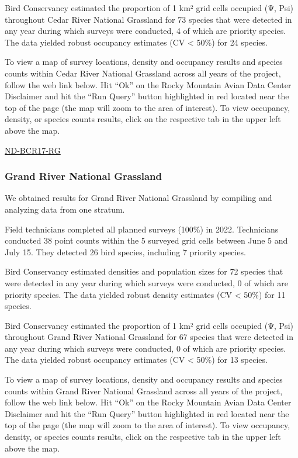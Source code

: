 \documentclass[
  letterpaper,
  DIV=11,
  numbers=noendperiod,
  oneside]{scrreprt}
\begin{document}
Bird Conservancy estimated the proportion of 1 km² grid cells occupied
(Ψ, Psi) throughout Cedar River National Grassland for 73 species that
were detected in any year during which surveys were conducted, 4 of
which are priority species. The data yielded robust occupancy estimates
(CV \textless{} 50\%) for 24 species.

To view a map of survey locations, density and occupancy results and
species counts within Cedar River National Grassland across all years of
the project, follow the web link below. Hit ``Ok'' on the Rocky Mountain
Avian Data Center Disclaimer and hit the ``Run Query'' button
highlighted in red located near the top of the page (the map will zoom
to the area of interest). To view occupancy, density, or species counts
results, click on the respective tab in the upper left above the map.

\href{http://www.rmbo.org/new_site/adc/QueryWindow.aspx\#N4IgzgLgTghhCuBbEAuABCAcgEQLQCEBhAJQEYB2XYgcXUIFMATGKNYgSwDd7XM52A9gDsYAGzTVYYMKJhDGIAL5A===}{ND-BCR17-RG}

\hypertarget{grand-river-national-grassland}{%
\subsubsection{Grand River National
Grassland}\label{grand-river-national-grassland}}

We obtained results for Grand River National Grassland by compiling and
analyzing data from one stratum.

Field technicians completed all planned surveys (100\%) in 2022.
Technicians conducted 38 point counts within the 5 surveyed grid cells
between June 5 and July 15. They detected 26 bird species, including 7
priority species.

Bird Conservancy estimated densities and population sizes for 72 species
that were detected in any year during which surveys were conducted, 0 of
which are priority species. The data yielded robust density estimates
(CV \textless{} 50\%) for 11 species.

Bird Conservancy estimated the proportion of 1 km² grid cells occupied
(Ψ, Psi) throughout Grand River National Grassland for 67 species that
were detected in any year during which surveys were conducted, 0 of
which are priority species. The data yielded robust occupancy estimates
(CV \textless{} 50\%) for 13 species.

To view a map of survey locations, density and occupancy results and
species counts within Grand River National Grassland across all years of
the project, follow the web link below. Hit ``Ok'' on the Rocky Mountain
Avian Data Center Disclaimer and hit the ``Run Query'' button
highlighted in red located near the top of the page (the map will zoom
to the area of interest). To view occupancy, density, or species counts
results, click on the respective tab in the upper left above the map.
\end{document}
